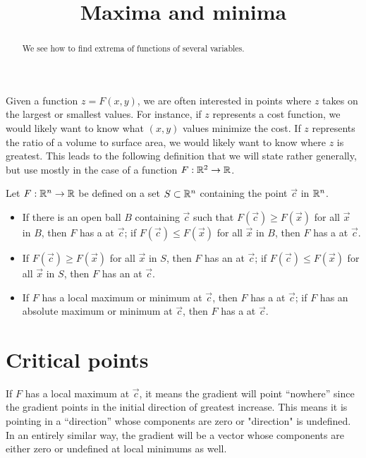\documentclass{ximera}
\title[Dig-In:]{Maxima and minima}
\begin{document}
\begin{abstract}
  We see how to find extrema of functions of several variables.
\end{abstract}
\maketitle


Given a function $z=F(x,y)$, we are often interested in points where
$z$ takes on the largest or smallest values. For instance, if $z$
represents a cost function, we would likely want to know what $(x,y)$
values minimize the cost. If $z$ represents the ratio of a volume to
surface area, we would likely want to know where $z$ is greatest. This
leads to the following definition that we will state rather generally,
but use mostly in the case of a function $F:\mathbb R^2\to\mathbb R$.

\begin{definition}
Let $F:\mathbb R^n\to\mathbb R$ be defined on a set $S\subset\mathbb R^n$ containing the
point $\vec{c}$ in $\mathbb R^n$.
\begin{itemize}
\item If there is an open ball $B$ containing $\vec{c}$ such that
  $F(\vec{c}) \geq F(\vec{x})$ for all $\vec{x}$ in $B$, then $F$ has a
   at $\vec{c}$; if $F(\vec{c}) \leq F(\vec{x})$ for all
  $\vec{x}$ in $B$, then $F$ has a  at $\vec{c}$.
\item If $F(\vec{c})\geq F(\vec{x})$ for all $\vec{x}$ in $S$, then $F$ has
  an  at $\vec{c}$; if $F(\vec{c})\leq F(\vec{x})$ for
  all $\vec{x}$ in $S$, then $F$ has an  at
  $\vec{c}$.
\item If $F$ has a local maximum or minimum at $\vec{c}$, then $F$ has a
   at $\vec{c}$; if $F$ has an absolute maximum or
  minimum at $\vec{c}$, then $F$ has a  at $\vec{c}$.
\end{itemize}
\end{definition}


\section{Critical points}



If $F$ has a local maximum at $\vec{c}$, it means the
gradient will point ``nowhere'' since the gradient points in the
initial direction of greatest increase. This means it is pointing in a
``direction'' whose components are zero or "direction" is undefined. In an
entirely similar way, the gradient will be a vector whose components
are either zero or undefined at local minimums as well. 
\end{document}
